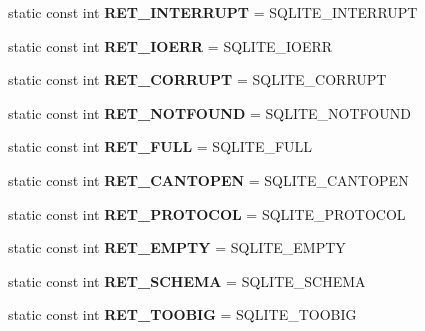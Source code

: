 \begin{DoxyCompactItemize}
\item 
\hypertarget{class_database_afccdcf8a8720bc99485daa138be17158}{
static const int {\bfseries RET\_\-INTERRUPT} = SQLITE\_\-INTERRUPT}
\label{class_database_afccdcf8a8720bc99485daa138be17158}

\item 
\hypertarget{class_database_a55077b6f30b3b82aefa739855debef6c}{
static const int {\bfseries RET\_\-IOERR} = SQLITE\_\-IOERR}
\label{class_database_a55077b6f30b3b82aefa739855debef6c}

\item 
\hypertarget{class_database_a95b4b785aaef860b142791e81e41cfc5}{
static const int {\bfseries RET\_\-CORRUPT} = SQLITE\_\-CORRUPT}
\label{class_database_a95b4b785aaef860b142791e81e41cfc5}

\item 
\hypertarget{class_database_a2ff620ed5ad3dcf19caf95f34b0b9f8d}{
static const int {\bfseries RET\_\-NOTFOUND} = SQLITE\_\-NOTFOUND}
\label{class_database_a2ff620ed5ad3dcf19caf95f34b0b9f8d}

\item 
\hypertarget{class_database_a27b8d57b890a223888c05f60d95275a4}{
static const int {\bfseries RET\_\-FULL} = SQLITE\_\-FULL}
\label{class_database_a27b8d57b890a223888c05f60d95275a4}

\item 
\hypertarget{class_database_a8f0d44bca3000d8f29febdf97eebc4b3}{
static const int {\bfseries RET\_\-CANTOPEN} = SQLITE\_\-CANTOPEN}
\label{class_database_a8f0d44bca3000d8f29febdf97eebc4b3}

\item 
\hypertarget{class_database_a6ba1597a7fdff79812e8afeec4179975}{
static const int {\bfseries RET\_\-PROTOCOL} = SQLITE\_\-PROTOCOL}
\label{class_database_a6ba1597a7fdff79812e8afeec4179975}

\item 
\hypertarget{class_database_a3f1efcdd58dcec591cc7bcf4c7f6e40d}{
static const int {\bfseries RET\_\-EMPTY} = SQLITE\_\-EMPTY}
\label{class_database_a3f1efcdd58dcec591cc7bcf4c7f6e40d}

\item 
\hypertarget{class_database_a929b853cbd2074dc647fd554ffd17cb0}{
static const int {\bfseries RET\_\-SCHEMA} = SQLITE\_\-SCHEMA}
\label{class_database_a929b853cbd2074dc647fd554ffd17cb0}

\item 
\hypertarget{class_database_aa18a95fb963300f11ff256d125123174}{
static const int {\bfseries RET\_\-TOOBIG} = SQLITE\_\-TOOBIG}
\label{class_database_aa18a95fb963300f11ff256d125123174}


\end{DoxyCompactItemize}
